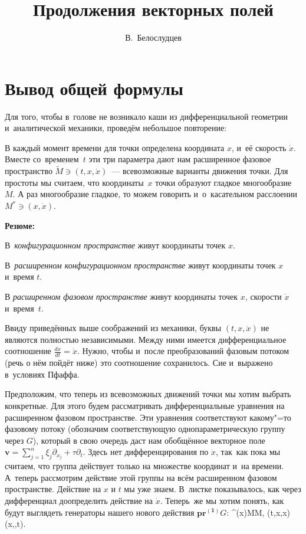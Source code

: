 \documentclass[a4paper,11pt]{article}
\def\[#1\]{\begin{align*}#1\end{align*}}
\begin{document}
\author{В.~Белослудцев}
\title{Продолжения векторных полей}
\maketitle

\section{Вывод общей формулы}

Для того, чтобы в~голове не возникало каши из дифференциальной геометрии
и~аналитической механики, проведём небольшое повторение: 

В каждый момент времени для точки определена координата $x$, и~её скорость
$\dot x$. Вместе со~временем~$t$ эти три параметра дают нам расширенное
фазовое пространство $\tilde M\ni(t,x,\dot x)$~— всевозможные варианты движения
точки. Для простоты мы считаем, что координаты~$x$ точки образуют гладкое
многообразие $M$. А раз многообразие гладкое, то можем говорить и~о~касательном
расслоении $M^*\ni(x,\dot x)$.

\vspace{0.6 cm}

\textbf{Резюме:}

В~\emph{конфигурационном пространстве} живут координаты точек $x$.

В~\emph{расширенном конфигурационном пространстве} живут координаты точек $x$
и~время $t$.

В \emph{расширенном фазовом пространстве} живут координаты точек $x$, скорости
$\dot x$ и~время~$t$.

\vspace{0.6 cm}

Ввиду приведённых выше соображений из механики, буквы $(t,x,\dot x)$ не
являются полностью независимыми. Между ними имеется дифференциальное
соотношение $\frac{dx}{dt}=\dot x$. Нужно, чтобы и~после преобразований
фазовым потоком (речь о нём пойдёт ниже) это соотношение сохранилось. Сие
и~выражено в~условиях Пфаффа.

Предположим, что теперь из всевозможных движений точки мы хотим выбрать
конкретные. Для этого будем рассматривать дифференциальные уравнения на
расширенном фазовом пространстве. Эти уравнения соответствуют какому"=то
фазовому потоку (обозначим соответствующую однопараметрическую группу через
$G$), который в свою очередь даст нам обобщённое векторное поле
$\mathbf{v}=\sum_{j=1}^n\xi_{j}\partial_{x_{j}}+\tau\partial_t$. Здесь нет
дифференцирования по $\dot{x}$, так~как пока мы считаем, что группа действует
только на множестве координат и~на времени. А~теперь рассмотрим действие этой
группы на всём расширенном фазовом пространстве. Действие на $x$ и $t$ мы уже
знаем. В~листке показывалось, как через дифференциал доопределить действие на
$\dot{x}$. Теперь~же мы хотим понять, как будут выглядеть генераторы нашего
нового действия $\mathbf{pr^{(1)}}G$:
	\[
	g^{\varepsilon}(x)\colon\tilde M\to\tilde M,
	\quad
	(t,x,\dot x)\mapsto(\hat x,,\hat t).
	\]
\end{document}
